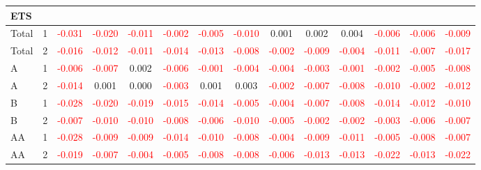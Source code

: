 \begin{table}[H]
{\begin{tabular}{llcccccccccccc}
\hline
ETS &  &  &  &  &  &  &  &  &  &  &  &  & \\
\hline
Total & 1 & \textcolor{red}{-0.031} & \textcolor{red}{-0.020} & \textcolor{red}{-0.011} & \textcolor{red}{-0.002} & \textcolor{red}{-0.005} & \textcolor{red}{-0.010} & 0.001 & 0.002 & 0.004 & \textcolor{red}{-0.006} & \textcolor{red}{-0.006} & \textcolor{red}{-0.009}\\
Total & 2 & \textcolor{red}{-0.016} & \textcolor{red}{-0.012} & \textcolor{red}{-0.011} & \textcolor{red}{-0.014} & \textcolor{red}{-0.013} & \textcolor{red}{-0.008} & \textcolor{red}{-0.002} & \textcolor{red}{-0.009} & \textcolor{red}{-0.004} & \textcolor{red}{-0.011} & \textcolor{red}{-0.007} & \textcolor{red}{-0.017}\\
A & 1 & \textcolor{red}{-0.006} & \textcolor{red}{-0.007} & 0.002 & \textcolor{red}{-0.006} & \textcolor{red}{-0.001} & \textcolor{red}{-0.004} & \textcolor{red}{-0.004} & \textcolor{red}{-0.003} & \textcolor{red}{-0.001} & \textcolor{red}{-0.002} & \textcolor{red}{-0.005} & \textcolor{red}{-0.008}\\
A & 2 & \textcolor{red}{-0.014} & 0.001 & 0.000 & \textcolor{red}{-0.003} & 0.001 & 0.003 & \textcolor{red}{-0.002} & \textcolor{red}{-0.007} & \textcolor{red}{-0.008} & \textcolor{red}{-0.010} & \textcolor{red}{-0.002} & \textcolor{red}{-0.012}\\
B & 1 & \textcolor{red}{-0.028} & \textcolor{red}{-0.020} & \textcolor{red}{-0.019} & \textcolor{red}{-0.015} & \textcolor{red}{-0.014} & \textcolor{red}{-0.005} & \textcolor{red}{-0.004} & \textcolor{red}{-0.007} & \textcolor{red}{-0.008} & \textcolor{red}{-0.014} & \textcolor{red}{-0.012} & \textcolor{red}{-0.010}\\
B & 2 & \textcolor{red}{-0.007} & \textcolor{red}{-0.010} & \textcolor{red}{-0.010} & \textcolor{red}{-0.008} & \textcolor{red}{-0.006} & \textcolor{red}{-0.010} & \textcolor{red}{-0.005} & \textcolor{red}{-0.002} & \textcolor{red}{-0.002} & \textcolor{red}{-0.003} & \textcolor{red}{-0.006} & \textcolor{red}{-0.007}\\
AA & 1 & \textcolor{red}{-0.028} & \textcolor{red}{-0.009} & \textcolor{red}{-0.009} & \textcolor{red}{-0.014} & \textcolor{red}{-0.010} & \textcolor{red}{-0.008} & \textcolor{red}{-0.004} & \textcolor{red}{-0.009} & \textcolor{red}{-0.011} & \textcolor{red}{-0.005} & \textcolor{red}{-0.008} & \textcolor{red}{-0.007}\\
AA & 2 & \textcolor{red}{-0.019} & \textcolor{red}{-0.007} & \textcolor{red}{-0.004} & \textcolor{red}{-0.005} & \textcolor{red}{-0.008} & \textcolor{red}{-0.008} & \textcolor{red}{-0.006} & \textcolor{red}{-0.013} & \textcolor{red}{-0.013} & \textcolor{red}{-0.022} & \textcolor{red}{-0.013} & \textcolor{red}{-0.022}\\

\end{tabular}}
\end{table}
